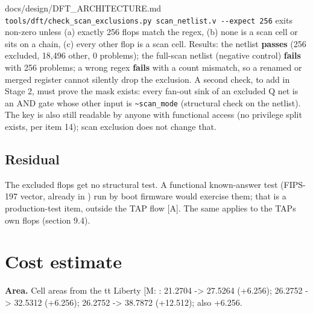 \begin{relocated}{docs/design/DFT_ARCHITECTURE.md}
\texttt{tools/\allowbreak{}dft/\allowbreak{}check\_\allowbreak{}scan\_\allowbreak{}exclusions.\allowbreak{}py\ scan\_\allowbreak{}netlist.\allowbreak{}v\ -\allowbreak{}-\allowbreak{}expect\ 256}
exits non-zero unless (a) exactly 256 flops match the regex, (b) none is
a scan cell or sits on a chain, (c) every other flop is a scan cell.
Results: the  netlist \textbf{passes} (256 excluded,
18,496 other, 0 problems); the full-scan netlist (negative control)
\textbf{fails} with 256 problems; a wrong regex \textbf{fails} with a
count mismatch, so a renamed or merged register cannot silently drop the
exclusion. A second check, to add in Stage 2, must prove the mask
exists: every fan-out sink of an excluded Q net is an AND gate whose
other input is \texttt{\textasciitilde{}scan\_\allowbreak{}mode}
(structural check on the netlist). The key is also still readable by
anyone with functional access (no privilege split exists, per
 item 14); scan exclusion does not change that.

\subsection{Residual}\label{tm:ch:dft-architecture:76-residual}

The excluded flops get no structural test. A functional known-answer
test (FIPS-197 vector, already in ) run by boot
firmware would exercise them; that is a production-test item, outside
the TAP flow {[}A{]}. The same applies to the TAP\textquotesingle s own
flops (section 9.4).

\section{Cost estimate}\label{tm:ch:dft-architecture:8-cost-estimate}

\textbf{Area.} Cell areas from the tt Liberty {[}M:
\code{sky130_fd_sc_hd__tt_025C_1v80.lib}{]}:  21.2704
-\textgreater{}  27.5264 (+6.256);  26.2752
-\textgreater{}  32.5312 (+6.256);  26.2752
-\textgreater{}  38.7872 (+12.512); 
also +6.256.

{\small\setlength{\tabcolsep}{4pt}

}
\end{relocated}
